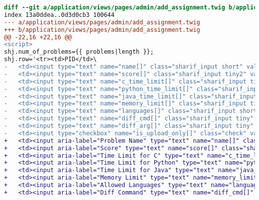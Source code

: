 \begin{itemize}
\begin{lstlisting}[language=diff, caption=Perubahan untuk mematuhi kriteria 1.3.1, label=lst_1.3.1, basicstyle=\ttfamily, frame=single,
columns=fullflexible, keepspaces=true, breaklines=true]
diff --git a/application/views/pages/admin/add_assignment.twig b/application/views/pages/admin/add_assignment.twig
index 13a0ddea..0d3d0cb3 100644
--- a/application/views/pages/admin/add_assignment.twig
+++ b/application/views/pages/admin/add_assignment.twig
@@ -22,16 +22,16 @@
<script>
shj.num_of_problems={{ problems|length }};
shj.row='<tr><td>PID</td>\
- 	<td><input type="text" name="name[]" class="sharif_input short" value="Problem "/></td>\
- 	<td><input type="text" name="score[]" class="sharif_input tiny2" value="100"/></td>\
- 	<td><input type="text" name="c_time_limit[]" class="sharif_input tiny2" value="500"/></td>\
- 	<td><input type="text" name="python_time_limit[]" class="sharif_input tiny2" value="1500"/></td>\
- 	<td><input type="text" name="java_time_limit[]" class="sharif_input tiny2" value="2000"/></td>\
- 	<td><input type="text" name="memory_limit[]" class="sharif_input tiny" value="50000"/></td>\
- 	<td><input type="text" name="languages[]" class="sharif_input short2" value="C,C++,Python 2,Python 3,Java"/></td>\
- 	<td><input type="text" name="diff_cmd[]" class="sharif_input tiny" value="diff"/></td>\
- 	<td><input type="text" name="diff_arg[]" class="sharif_input tiny" value="-bB"/></td>\
- 	<td><input type="checkbox" name="is_upload_only[]" class="check" value="PID"/><td><i class="fa fa-times-circle fa-lg color1 delete_problem pointer"></i></td></td>\
+ 	<td><input aria-label="Problem Name" type="text" name="name[]" class="sharif_input short" value="Problem "/></td>\
+ 	<td><input aria-label="Score" type="text" name="score[]" class="sharif_input tiny2" value="100"/></td>\
+ 	<td><input aria-label="Time Limit for C" type="text" name="c_time_limit[]" class="sharif_input tiny2" value="500"/></td>\
+ 	<td><input aria-label="Time Limit for Python" type="text" name="python_time_limit[]" class="sharif_input tiny2" value="1500"/></td>\
+ 	<td><input aria-label="Time Limit for Java" type="text" name="java_time_limit[]" class="sharif_input tiny2" value="2000"/></td>\
+ 	<td><input aria-label="Memory Limit" type="text" name="memory_limit[]" class="sharif_input tiny" value="50000"/></td>\
+ 	<td><input aria-label="Allowed Languages" type="text" name="languages[]" class="sharif_input short2" value="C,C++,Python 2,Python 3,Java"/></td>\
+ 	<td><input aria-label="Diff Command" type="text" name="diff_cmd[]" class="sharif_input tiny" value="diff"/></td>\

\end{lstlisting}
\end{itemize}
